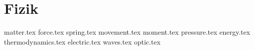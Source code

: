 \chapter{Fizik}
\pagestyle{fancy}
\fancyhf{}
\lhead{\thepage}
{matter.tex}
{force.tex}
{spring.tex}
{movement.tex}
{moment.tex}
{pressure.tex}
{energy.tex}
{thermodynamics.tex}
{electric.tex}
{waves.tex}
{optic.tex}